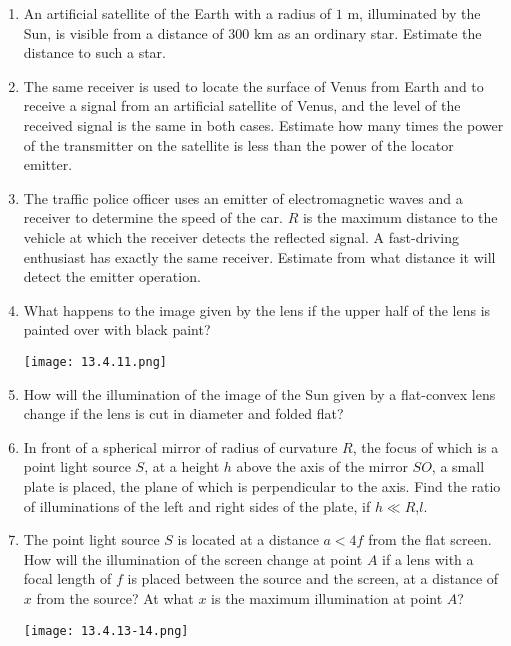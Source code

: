 \documentclass{article}
\begin{document}
\begin{enumerate}[label=13.4.\arabic*]
\item An artificial satellite of the Earth with a radius of $1$ m, illuminated by the Sun, is visible from a distance of $300$ km as an ordinary star. Estimate the distance to such a star.

\item The same receiver is used to locate the surface of Venus from Earth and to receive a signal from an artificial satellite of Venus, and the level of the received signal is the same in both cases. Estimate how many times the power of the transmitter on the satellite is less than the power of the locator emitter.

\item The traffic police officer uses an emitter of electromagnetic waves and a receiver to determine the speed of the car. $R$ is the maximum distance to the vehicle at which the receiver detects the reflected signal. A fast-driving enthusiast has exactly the same receiver. Estimate from what distance it will detect the emitter operation.

\item What happens to the image given by the lens if the upper half of the lens is painted over with black paint?

\begin{center}
    \texttt{[image: 13.4.11.png]}
\end{center}

\item How will the illumination of the image of the Sun given by a flat-convex lens change if the lens is cut in diameter and folded flat?

\item In front of a spherical mirror of radius of curvature $R$, the focus of which is a point light source $S$, at a height $h$ above the axis of the mirror $SO$, a small plate is placed, the plane of which is perpendicular to the axis. Find the ratio of illuminations of the left and right sides of the plate, if $h \ll R$,$l$.

\item The point light source $S$ is located at a distance $a < 4f$ from the flat screen. How will the illumination of the screen change at point $A$ if a lens with a focal length of $f$ is placed between the source and the screen, at a distance of $x$ from the source? At what $x$ is the maximum illumination at point $A$?

\begin{center}
    \texttt{[image: 13.4.13-14.png]}
\end{center}


\end{enumerate}
\end{document}
